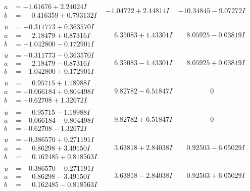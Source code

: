 \documentclass[1p]{elsarticle_modified}
\theoremstyle{definition}
\begin{document}
$$\begin{array}{c|c|c}
\begin{aligned}
a &= -1.61676 + 2.24024 I \\
b &= \phantom{-}0.416359 + 0.793132 I\end{aligned}
 & -1.04722 + 2.44814 I & -10.34845 - 9.07272 I \\ \hline\begin{aligned}
u &= -0.311773 + 0.363570 I \\
a &= \phantom{-}2.18479 + 0.87316 I \\
b &= -1.042800 - 0.172901 I\end{aligned}
 & \phantom{-}6.35083 + 1.43301 I & \phantom{-}8.05925 - 0.03819 I \\ \hline\begin{aligned}
u &= -0.311773 - 0.363570 I \\
a &= \phantom{-}2.18479 - 0.87316 I \\
b &= -1.042800 + 0.172901 I\end{aligned}
 & \phantom{-}6.35083 - 1.43301 I & \phantom{-}8.05925 + 0.03819 I \\ \hline\begin{aligned}
u &= \phantom{-}0.95715 + 1.18988 I \\
a &= -0.066184 + 0.804498 I \\
b &= -0.62708 + 1.32672 I\end{aligned}
 & \phantom{-}9.82782 - 6.51847 I & \phantom{-0.000000 } 0 \\ \hline\begin{aligned}
u &= \phantom{-}0.95715 - 1.18988 I \\
a &= -0.066184 - 0.804498 I \\
b &= -0.62708 - 1.32672 I\end{aligned}
 & \phantom{-}9.82782 + 6.51847 I & \phantom{-0.000000 } 0 \\ \hline\begin{aligned}
u &= -0.386570 + 0.271191 I \\
a &= \phantom{-}0.86298 + 3.49150 I \\
b &= \phantom{-}0.162485 + 0.818563 I\end{aligned}
 & \phantom{-}3.63818 + 2.84038 I & \phantom{-}0.92503 - 6.05029 I \\ \hline\begin{aligned}
u &= -0.386570 - 0.271191 I \\
a &= \phantom{-}0.86298 - 3.49150 I \\
b &= \phantom{-}0.162485 - 0.818563 I\end{aligned}
 & \phantom{-}3.63818 - 2.84038 I & \phantom{-}0.92503 + 6.05029 I \\ \hline\begin{aligned}

\end{aligned}
\end{array}$$
\end{document}
